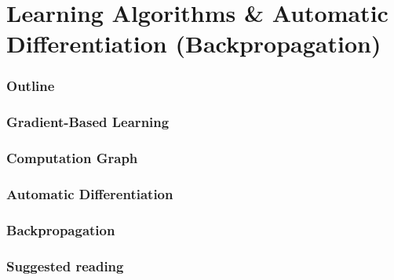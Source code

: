 \renewcommand{\prevpart}{3 }
\renewcommand{\thispart}{4 }
\renewcommand{\nextpart}{5 }
\renewcommand{\thispartname}{
   Learning Algorithms \& 
   Automatic Differentiation (Backpropagation)}

\part{\thispartname}



\section{Outline}


% 
\section{Gradient-Based Learning}

\section{Computation Graph}



\section{Automatic Differentiation}







\section{Backpropagation}

\section{Suggested reading}

